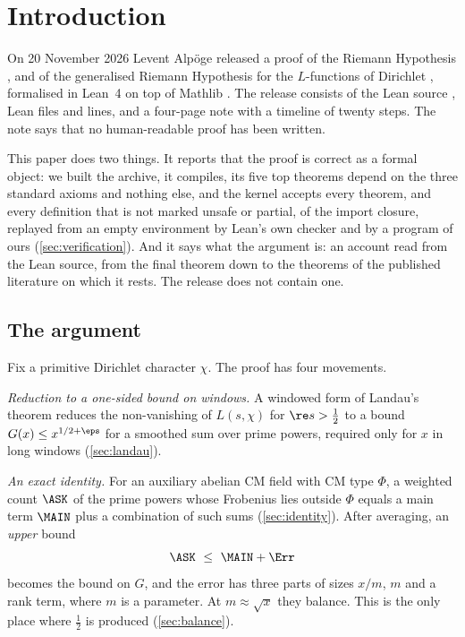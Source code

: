 \section{Introduction}\label{sec:intro}

On 20 November 2026 Levent Alp\"oge released a proof of the Riemann Hypothesis
\cite{riemann1859anzahl}, and of the generalised Riemann Hypothesis for the $L$-functions of
Dirichlet \cite{dirichlet1837beweis}, formalised in Lean~4
\cite{demoura2021lean4} on top of Mathlib \cite{mathlib2020}. The release consists of the Lean
source \cite{alpoge2026lean}, \filecount{} Lean files and \linecount{} lines, and a four-page note
\cite{alpoge2026remark}
with a timeline of twenty steps. The note says that no human-readable proof has been written.

This paper does two things. It reports that the proof is correct as a formal object: we built
the archive, it compiles, its five top theorems depend on the three standard axioms and
nothing else, and the kernel accepts every theorem, and every definition that is not marked
unsafe or partial, of the import closure, replayed from an empty environment by Lean's own
checker and by a program of ours (\cref{sec:verification}). And it says
what the argument
is: an account read from the Lean source, from the final theorem down to the theorems of the
published literature on which it rests. The release does not contain one.

\subsection{The argument}
Fix a primitive Dirichlet character $\chi$. The proof has four movements.

\emph{Reduction to a one-sided bound on windows.} A windowed form of Landau's theorem reduces
the non-vanishing of $L(s,\chi)$ for $\re s>\tfrac12$ to a bound $G(x)\le x^{1/2+\eps}$ for a
smoothed sum over prime powers, required only for $x$ in long windows (\cref{sec:landau}).

\emph{An exact identity.} For an auxiliary abelian CM field with CM type $\Phi$, a weighted
count $\ASK$ of the prime powers whose Frobenius lies outside $\Phi$ equals a main term
$\MAIN$ plus a combination of such sums (\cref{sec:identity}). After averaging, an
\emph{upper} bound
\[
\ASK\ \le\ \MAIN+\Err
\]
becomes the bound on $G$, and the error has three parts of sizes $x/m$, $m$ and a rank term,
where $m$ is a parameter. At $m\approx\sqrt x$ they balance. This is the only place where
$\tfrac12$ is produced (\cref{sec:balance}).

